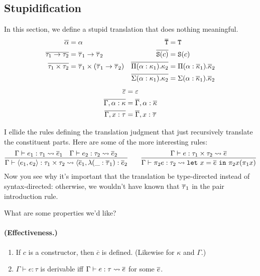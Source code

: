 \subsection{Stupidification}
In this section, we define a stupid translation that does nothing meaningful.
\begin{align*}
  \overline{\alpha} &= \alpha &\overline{\textnormal{\texttt{T}}} &= \textnormal{\texttt{T}}\\
  \overline{\tau_1 \to \tau_2} &= \overline{\tau}_1 \to \overline{\tau}_2 &\overline{\textnormal{\texttt{S}}(c)} &= \textnormal{\texttt{S}}(c)\\
  \overline{\tau_1 \times \tau_2} &= \overline{\tau}_1 \times (\overline{\tau}_1 \to \overline{\tau}_2) &\overline{\Pi(\alpha : \kappa_1).\kappa_2} &= \Pi(\alpha : \overline{\kappa}_1).\overline{\kappa}_2\\
  &&\overline{\Sigma(\alpha : \kappa_1).\kappa_2} &= \Sigma(\alpha : \overline{\kappa}_1).\overline{\kappa}_2
\end{align*}
\begin{align*}
  \overline{\varepsilon} &= \varepsilon\\
  \overline{\Gamma, \alpha : \kappa} &= \overline{\Gamma}, \alpha : \overline{\kappa}\\
  \overline{\Gamma, x : \tau} &= \overline{\Gamma}, x : \overline{\tau}
\end{align*}

I ellide the rules defining the translation judgment that just recursively translate the
constituent parts. Here are some of the more interesting rules:
\[
  \infer
    {\Gamma \vdash \langle e_1, e_2 \rangle : \tau_1 \times \tau_2
      \leadsto \langle \ebar_1, \lambda(\_ : \taubar_1) : \ebar_2}
    {\Gamma \vdash e_1 : \tau_1 \leadsto \ebar_1
    &\Gamma \vdash e_2 : \tau_2 \leadsto \ebar_2}
  \qquad
  \infer
    {\Gamma \vdash \pi_2e : \tau_2 \leadsto \letv{x}{\ebar}{\pi_2 x(\pi_1 x)}}
    {\Gamma \vdash e : \tau_1 \times \tau_2 \leadsto \ebar}
\]
Now you see why it's important that the translation be type-directed instead of syntax-directed:
otherwise, we wouldn't have known that $\overline{\tau}_1$ in the pair introduction rule.

What are some properties we'd like?
\paragraph{(Effectiveness.)}
\begin{enumerate}[1.]
  \item If $c$ is a constructor, then $\overline{c}$ is defined.
    (Likewise for $\kappa$ and $\Gamma$.)
  \item $\Gamma \vdash e : \tau$ is derivable iff $\Gamma \vdash e : \tau \leadsto \overline{e}$
    for some $\overline{e}$.
\end{enumerate}
